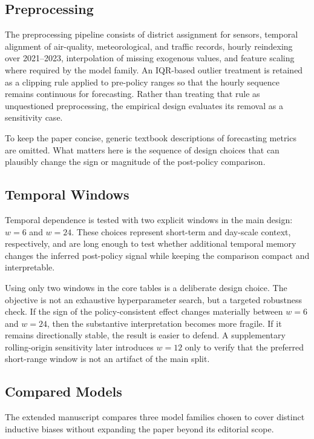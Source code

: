 \subsection{Preprocessing}

The preprocessing pipeline consists of district assignment for sensors, temporal alignment of air-quality, meteorological, and traffic records, hourly reindexing over 2021--2023, interpolation of missing exogenous values, and feature scaling where required by the model family. An IQR-based outlier treatment is retained as a clipping rule applied to pre-policy ranges so that the hourly sequence remains continuous for forecasting. Rather than treating that rule as unquestioned preprocessing, the empirical design evaluates its removal as a sensitivity case.

To keep the paper concise, generic textbook descriptions of forecasting metrics are omitted. What matters here is the sequence of design choices that can plausibly change the sign or magnitude of the post-policy comparison.

\subsection{Temporal Windows}

Temporal dependence is tested with two explicit windows in the main design: $w=6$ and $w=24$. These choices represent short-term and day-scale context, respectively, and are long enough to test whether additional temporal memory changes the inferred post-policy signal while keeping the comparison compact and interpretable.

Using only two windows in the core tables is a deliberate design choice. The objective is not an exhaustive hyperparameter search, but a targeted robustness check. If the sign of the policy-consistent effect changes materially between $w=6$ and $w=24$, then the substantive interpretation becomes more fragile. If it remains directionally stable, the result is easier to defend. A supplementary rolling-origin sensitivity later introduces $w=12$ only to verify that the preferred short-range window is not an artifact of the main split.

\subsection{Compared Models}

The extended manuscript compares three model families chosen to cover distinct inductive biases without expanding the paper beyond its editorial scope.


